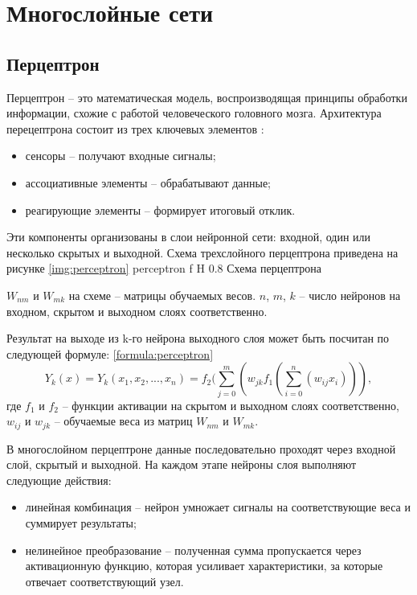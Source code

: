 \section{Многослойные сети}
\subsection{Перцептрон}
Перцептрон -- это математическая модель, воспроизводящая принципы обработки информации, схожие с работой человеческого головного мозга. Архитектура перецептрона состоит из трех ключевых элементов \cite{perceptron}:
\begin{itemize}
	\item сенсоры -- получают входные сигналы;
	\item ассоциативные элементы -- обрабатывают данные;
	\item реагирующие элементы -- формирует итоговый отклик.
\end{itemize}

Эти компоненты организованы в слои нейронной сети: входной, один или несколько скрытых и выходной.
Схема трехслойного перцептрона приведена на рисунке \ref{img:perceptron}
{perceptron} %
{f} %
{H} %
{0.8\textwidth} %
{Схема перцептрона} %

$W_{nm}$ и $W_{mk}$ на схеме -- матрицы обучаемых весов. $n$, $m$, $k$ -- число нейронов на входном, скрытом и выходном слоях соответственно. 

Результат на выходе из k-го нейрона выходного слоя может быть посчитан по следующей формуле: \ref{formula:perceptron}
\begin{equation}\label{formula:perceptron}
	Y_k(x) = Y_k(x_1, x_2, ..., x_n) = f_2(\sum_{j=0}^{m}(w_{jk} f_1(\sum_{i=0}^{n}(w_{ij}x_i))),
\end{equation}
где $f_1$ и $f_2$ -- функции активации на скрытом и выходном слоях соответственно, $w_{ij}$ и $w_{jk}$ -- обучаемые веса из матриц $W_{nm}$ и $W_{mk}$.

В многослойном перцептроне данные последовательно проходят через входной слой, скрытый и выходной.
На каждом этапе нейроны слоя выполняют следующие действия:
\begin{itemize}
	\item линейная комбинация -- нейрон умножает сигналы на соответствующие веса и суммирует результаты;
	\item нелинейное преобразование -- полученная сумма пропускается через активационную функцию, которая усиливает характеристики, за которые отвечает соответствующий узел.
\end{itemize}

